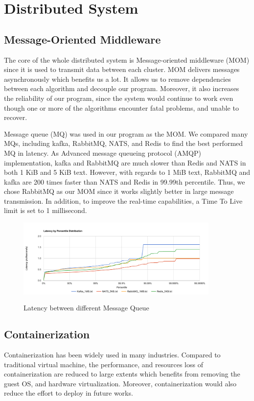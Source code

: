 \documentclass[runningheads]{llncs}
\begin{document}
\section{Distributed System}

\subsection{Message-Oriented Middleware}
The core of the whole distributed system is 
Message-oriented middleware (MOM) since it is used to 
transmit data between each cluster. MOM delivers messages 
asynchronously which benefits us a lot. It allows us to 
remove dependencies between each algorithm and decouple our 
program. Moreover, it also increases the reliability of our 
program, since the system would continue to work even 
though one or more of the algorithms encounter fatal 
problems, and unable to recover. 

Message queue (MQ) was used in our program as the MOM. We 
compared many MQs, including kafka, RabbitMQ, NATS, and 
Redis to find the best performed MQ in latency. As 
Advanced message queueing protocol (AMQP) implementation, 
kafka and RabbitMQ are much slower than Redis and NATS in 
both 1 KiB and 5 KiB text. However, with regards to 1 MiB 
text, RabbitMQ and kafka are 200 times faster than NATS and 
Redis in 99.99th percentile. Thus, we chose RabbitMQ as our 
MOM since it works slightly better in large message 
transmission. In addition, to improve the real-time 
capabilities, a Time To Live limit is set to 1 millisecond.

\begin{figure}
	\centering
	\includegraphics[width=10cm]{reference/mq}
	\label{fig:MQ}
	\caption{Latency between different Message Queue\cite{MQ}}
\end{figure}


\subsection{Containerization}
Containerization has been widely used in many industries. 
Compared to traditional virtual machine, the performance, 
and resources loss of containerization are reduced to large 
extents which benefits from removing the guest OS, and 
hardware virtualization. Moreover, containerization would 
also reduce the effort to deploy in future works. 
\end{document}
